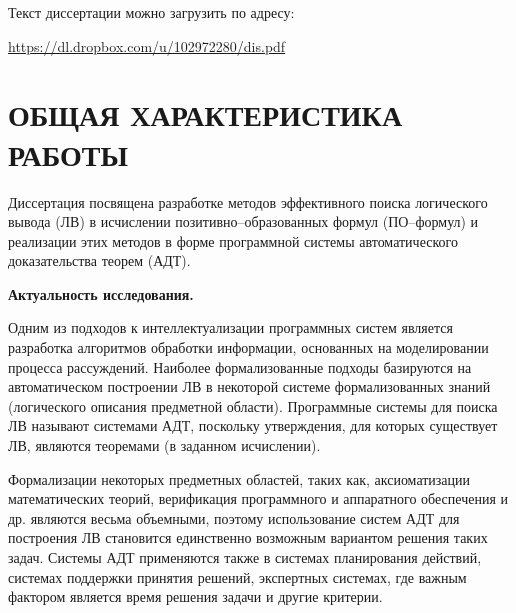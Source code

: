 \documentclass[a4paper]{report}
\begin{document}
Текст диссертации можно загрузить по адресу:

\url{https://dl.dropbox.com/u/102972280/dis.pdf}

\newpage

\section*{ОБЩАЯ ХАРАКТЕРИСТИКА РАБОТЫ}

Диссертация посвящена разработке методов эффективного поиска логического вывода (ЛВ) в исчислении позитивно--образованных формул (ПО--формул) и реализации этих методов в форме программной системы автоматического доказательства теорем (АДТ).

\textbf{Актуальность исследования.}

Одним из подходов к интеллектуализации программных систем является разработка алгоритмов обработки информации, основанных на моделировании процесса рассуждений. Наиболее формализованные подходы базируются на автоматическом построении ЛВ в некоторой системе формализованных знаний (логического описания предметной области). Программные системы для поиска ЛВ называют системами АДТ, поскольку утверждения, для которых существует ЛВ, являются теоремами (в заданном исчислении).

Формализации некоторых предметных областей, таких как, аксиоматизации математических теорий, верификация программного и аппаратного обеспечения и др. являются весьма объемными, поэтому использование систем АДТ для построения ЛВ становится единственно возможным вариантом решения таких задач. Системы АДТ применяются также в системах планирования действий, системах поддержки принятия решений, экспертных системах, где важным фактором является время решения задачи и другие критерии.


\end{document}
